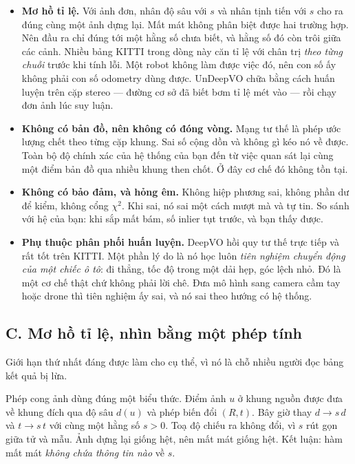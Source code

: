 \documentclass[../../deep_learning.tex]{subfiles}
\begin{document}
\begin{itemize}
\item \textbf{Mơ hồ tỉ lệ.} Với ảnh đơn, nhân độ sâu với \(s\) và nhân tịnh tiến với \(s\) cho ra đúng cùng một ảnh dựng lại. Mất mát không phân biệt được hai trường hợp. Nên đầu ra chỉ đúng tới một hằng số chưa biết, và hằng số đó còn trôi giữa các cảnh. Nhiều bảng KITTI trong dòng này căn tỉ lệ với chân trị \emph{theo từng chuỗi} trước khi tính lỗi. Một robot không làm được việc đó, nên con số ấy không phải con số odometry dùng được. UnDeepVO \cite{li2018undeepvo} chữa bằng cách huấn luyện trên cặp stereo --- đường cơ sở đã biết bơm tỉ lệ mét vào --- rồi chạy đơn ảnh lúc suy luận.
\item \textbf{Không có bản đồ, nên không có đóng vòng.} Mạng tư thế là phép ước lượng chết theo từng cặp khung. Sai số cộng dồn và không gì kéo nó về được. Toàn bộ độ chính xác của hệ thống của bạn đến từ việc quan sát lại cùng một điểm bản đồ qua nhiều khung then chốt. Ở đây cơ chế đó không tồn tại.
\item \textbf{Không có bảo đảm, và hỏng êm.} Không hiệp phương sai, không phần dư để kiểm, không cổng \(\chi^2\). Khi sai, nó sai một cách mượt mà và tự tin. So sánh với hệ của bạn: khi sắp mất bám, số inlier tụt trước, và bạn thấy được.
\item \textbf{Phụ thuộc phân phối huấn luyện.} DeepVO \cite{wang2017deepvo} hồi quy tư thế trực tiếp và rất tốt trên KITTI. Một phần lý do là nó học luôn \emph{tiên nghiệm chuyển động của một chiếc ô tô}: đi thẳng, tốc độ trong một dải hẹp, góc lệch nhỏ. Đó là một cơ chế thật chứ không phải lời chê. Đưa mô hình sang camera cầm tay hoặc drone thì tiên nghiệm ấy sai, và nó sai theo hướng có hệ thống.
\end{itemize}

\subsection{C. Mơ hồ tỉ lệ, nhìn bằng một phép tính}
Giới hạn thứ nhất đáng được làm cho cụ thể, vì nó là chỗ nhiều người đọc bảng kết quả bị lừa.

Phép cong ảnh dùng đúng một biểu thức. Điểm ảnh \(u\) ở khung nguồn được đưa về khung đích qua độ sâu \(d(u)\) và phép biến đổi \((R, t)\). Bây giờ thay \(d \to s\,d\) và \(t \to s\,t\) với cùng một hằng số \(s>0\). Toạ độ chiếu ra không đổi, vì \(s\) rút gọn giữa tử và mẫu. Ảnh dựng lại giống hệt, nên mất mát giống hệt. Kết luận: hàm mất mát \emph{không chứa thông tin nào} về \(s\).
\end{document}
